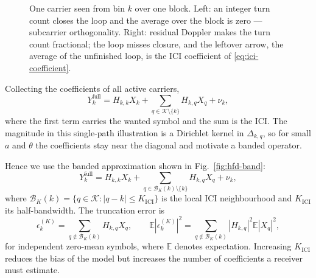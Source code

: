 \documentclass[conference]{IEEEtran}
\newcommand{\Kset}{\mathcal{K}}
\newcommand{\E}{\mathbb{E}}
\begin{document}
\begin{figure}[t]
\centering
{}
\caption{One carrier seen from bin \(k\) over one block.  Left: an integer
turn count closes the loop and the average over the block is zero ---
subcarrier orthogonality.  Right: residual Doppler makes the turn count
fractional; the loop misses closure, and the leftover arrow, the average of
the unfinished loop, is the ICI coefficient of
\eqref{eq:ici-coefficient}.}
\label{fig:loops}
\end{figure}  Collecting the coefficients of all active carriers,
\begin{equation}
  Y_k^{\mathrm{full}}
  =
  H_{k,k}X_k
  +
  \sum_{q\in\Kset\setminus\{k\}}
  H_{k,q}X_q
  +
  \nu_k,
  \label{eq:ici-row}
\end{equation}
where the first term carries the wanted symbol and the sum is the ICI.  The
magnitude in this single-path illustration is a Dirichlet kernel in
\(\Delta_{k,q}\), so for small \(a\) and \(\theta\) the coefficients stay near
the diagonal and motivate a banded operator.

Hence we use the banded approximation shown in
Fig.~\ref{fig:hfd-band}:
\begin{equation}
  Y_k^{\mathrm{full}}
  =
  H_{k,k}X_k
  +\sum_{q\in\mathcal B_K(k)\setminus\{k\}}H_{k,q}X_q
  +\nu_k,
  \label{eq:banded}
\end{equation}
where \(\mathcal B_K(k)=\{q\in\Kset:\left|q-k\right|\le K_{\mathrm{ICI}}\}\)
is the local ICI neighbourhood and \(K_{\mathrm{ICI}}\) its half-bandwidth.
The truncation error is
\begin{equation}
  \epsilon_k^{(K)}
  =\sum_{q\notin\mathcal B_K(k)}H_{k,q}X_q,
  \qquad
  \E\left|\epsilon_k^{(K)}\right|^2
  =\sum_{q\notin\mathcal B_K(k)}\left|H_{k,q}\right|^2\E\left|X_q\right|^2,
  \label{eq:truncation}
\end{equation}
for independent zero-mean symbols, where \(\E\) denotes expectation.
Increasing \(K_{\mathrm{ICI}}\) reduces the bias of the model but
increases the number of coefficients a receiver must estimate.
\end{document}
